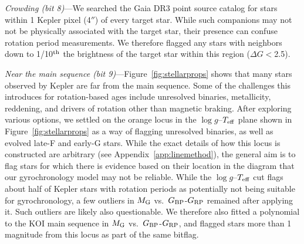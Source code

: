 \documentclass[11pt,twocolumn,tighten]{aastex63}
\begin{document}
{\it Crowding (bit 8)}---We searched the Gaia DR3 point source catalog
for stars within 1 Kepler pixel (4$''$) of every target star.  While
such companions may not not be physically associated with the target
star, their presence can confuse rotation period measurements.  We
therefore flagged any stars with neighbors down to 1/10$^{\rm th}$ the
brightness of the target star within this region ($\Delta G$$<$2.5).

{\it Near the main sequence (bit 9)}---Figure~\ref{fig:stellarprops} shows
that many stars observed by Kepler
are far from the main sequence.  Some of the challenges this introduces
for rotation-based ages include unresolved binaries, metallicity,
reddening, and drivers of rotation other than magnetic braking.
After exploring various options, we settled on the orange locus in the
$\log g$--$T_{\rm eff}$ plane shown in Figure~\ref{fig:stellarprops}
as a way of flagging unresolved binaries, as well as evolved
late-F and early-G stars.  While the exact details of how this locus
is constructed are arbitrary (see Appendix~\ref{app:linemethod}), the
general aim is to flag stars for which there is evidence based on
their location in the  diagram that our gyrochronology model may not
be reliable.  While the $\log g$--$T_{\rm eff}$ cut flags about half
of Kepler stars with rotation periods as potentially not being
suitable for gyrochronology, a few outliers in $M_{\rm G}$ vs.~$G_{\rm
BP}$-$G_{\rm RP}$ remained after applying it.  Such outliers are
likely also questionable.  We therefore also fitted a polynomial to
the KOI main sequence in $M_{\rm G}$ vs.~$G_{\rm
	BP}$-$G_{\rm RP}$, and flagged stars more than 1\,magnitude from
this locus as part of the same bitflag.

\end{document}
